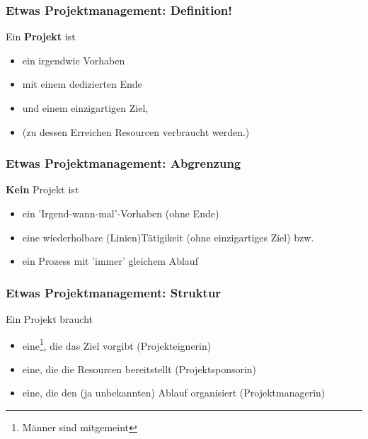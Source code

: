 %
%
%
%
%


\begin{frame}
  \frametitle{Etwas Projektmanagement: Definition! }
	
	\begin{block}{Ein \textbf{Projekt} ist}
	\vspace{0.5cm}

		\begin{itemize}
			\item ein irgendwie Vorhaben
			\item mit einem dedizierten Ende 
			\item  und einem einzigartigen Ziel,
			\item (zu dessen Erreichen Resourcen verbraucht werden.)
		\end{itemize}
	\end{block}
\end{frame}

\begin{frame}
  \frametitle{Etwas Projektmanagement: Abgrenzung}
	
	\begin{block}{\textbf{Kein} Projekt ist}
	\vspace{0.5cm}
		
		\begin{itemize}
			\item ein 'Irgend-wann-mal'-Vorhaben (ohne Ende)
			\item eine wiederholbare (Linien)Tätigikeit (ohne einzigartiges Ziel) bzw.
			\item ein Prozess mit 'immer' gleichem Ablauf
		\end{itemize}
	\end{block}
\end{frame}

\begin{frame}
  \frametitle{Etwas Projektmanagement: Struktur}
	
	\begin{block}{Ein Projekt braucht}
	\vspace{0.5cm}
		
		\begin{itemize}
			\item eine\footnote{Männer sind mitgemeint}, die das Ziel vorgibt (Projekteignerin)
			\item eine, die die Resourcen bereitstellt (Projektsponsorin)
			\item eine, die den (ja unbekannten) Ablauf organisiert (Projektmanagerin)
		\end{itemize}
	\end{block}
\end{frame}

